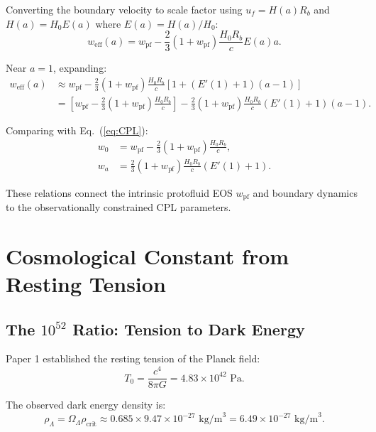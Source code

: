 \documentclass[11pt,a4paper]{article}
\newcommand{\rhocrit}{\ensuremath{\rho_{\mathrm{crit}}}}
\newcommand{\Tzero}{\ensuremath{T_0}}
\newcommand{\wpf}{\ensuremath{w_{\mathrm{pf}}}}
\newcommand{\weff}{\ensuremath{w_{\mathrm{eff}}}}
\newcommand{\OmegaLam}{\ensuremath{\Omega_\Lambda}}
\theoremstyle{definition}
\theoremstyle{remark}
\begin{document}
Converting the boundary velocity to scale factor using $u_f = H(a) R_b$ and $H(a) = H_0 E(a)$ where $E(a) = H(a)/H_0$:
\begin{equation}
\weff(a) = \wpf - \frac{2}{3}(1 + \wpf)\frac{H_0 R_b}{c} E(a) a.
\end{equation}

Near $a = 1$, expanding:
\begin{align}
\weff(a) &\approx \wpf - \frac{2}{3}(1 + \wpf)\frac{H_0 R_b}{c}[1 + (E'(1) + 1)(a-1)] \\
&= \left[\wpf - \frac{2}{3}(1 + \wpf)\frac{H_0 R_b}{c}\right] - \frac{2}{3}(1 + \wpf)\frac{H_0 R_b}{c}(E'(1) + 1)(a - 1).
\end{align}

Comparing with Eq.~(\ref{eq:CPL}):
\begin{align}
w_0 &= \wpf - \frac{2}{3}(1 + \wpf)\frac{H_0 R_b}{c}, \label{eq:w0_from_wpf} \\
w_a &= \frac{2}{3}(1 + \wpf)\frac{H_0 R_b}{c}(E'(1) + 1). \label{eq:wa_from_wpf}
\end{align}

These relations connect the intrinsic protofluid EOS $\wpf$ and boundary dynamics to the observationally constrained CPL parameters.

\section{Cosmological Constant from Resting Tension}
\label{sec:lambda_tension}

\subsection{The $10^{52}$ Ratio: Tension to Dark Energy}
\label{sec:tension_ratio}

Paper 1 established the resting tension of the Planck field:
\begin{equation}
\Tzero = \frac{c^4}{8\pi G} = 4.83 \times 10^{42} \text{ Pa}.
\end{equation}

The observed dark energy density is:
\begin{equation}
\rho_\Lambda = \OmegaLam \rhocrit \approx 0.685 \times 9.47 \times 10^{-27} \text{ kg/m}^3 = 6.49 \times 10^{-27} \text{ kg/m}^3.
\end{equation}
\end{document}
